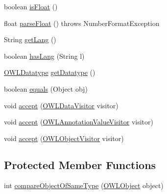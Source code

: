 \begin{DoxyCompactItemize}
\item 
boolean \hyperlink{classuk_1_1ac_1_1manchester_1_1cs_1_1owl_1_1owlapi_1_1_o_w_l_literal_impl_boolean_a41fe2545d488d2fba782b824fadce5df}{is\-Float} ()
\item 
float \hyperlink{classuk_1_1ac_1_1manchester_1_1cs_1_1owl_1_1owlapi_1_1_o_w_l_literal_impl_boolean_a98d226538c9fdf371e3acd25391d15f3}{parse\-Float} ()  throws Number\-Format\-Exception 
\item 
String \hyperlink{classuk_1_1ac_1_1manchester_1_1cs_1_1owl_1_1owlapi_1_1_o_w_l_literal_impl_boolean_afed3924cccc1c0922913be49980ade4b}{get\-Lang} ()
\item 
boolean \hyperlink{classuk_1_1ac_1_1manchester_1_1cs_1_1owl_1_1owlapi_1_1_o_w_l_literal_impl_boolean_ae4c2edb168c84b374b988f55fb19ab98}{has\-Lang} (String l)
\item 
\hyperlink{interfaceorg_1_1semanticweb_1_1owlapi_1_1model_1_1_o_w_l_datatype}{O\-W\-L\-Datatype} \hyperlink{classuk_1_1ac_1_1manchester_1_1cs_1_1owl_1_1owlapi_1_1_o_w_l_literal_impl_boolean_a3539c0a6c54b627b1e14080d4c434605}{get\-Datatype} ()
\item 
boolean \hyperlink{classuk_1_1ac_1_1manchester_1_1cs_1_1owl_1_1owlapi_1_1_o_w_l_literal_impl_boolean_a57839b38049d51274ae7412f03531224}{equals} (Object obj)
\item 
void \hyperlink{classuk_1_1ac_1_1manchester_1_1cs_1_1owl_1_1owlapi_1_1_o_w_l_literal_impl_boolean_a24e513d913080412d6f4e68d5badd43f}{accept} (\hyperlink{interfaceorg_1_1semanticweb_1_1owlapi_1_1model_1_1_o_w_l_data_visitor}{O\-W\-L\-Data\-Visitor} visitor)
\item 
void \hyperlink{classuk_1_1ac_1_1manchester_1_1cs_1_1owl_1_1owlapi_1_1_o_w_l_literal_impl_boolean_a65b9541763f59bb92917425d8c55010c}{accept} (\hyperlink{interfaceorg_1_1semanticweb_1_1owlapi_1_1model_1_1_o_w_l_annotation_value_visitor}{O\-W\-L\-Annotation\-Value\-Visitor} visitor)
\item 
void \hyperlink{classuk_1_1ac_1_1manchester_1_1cs_1_1owl_1_1owlapi_1_1_o_w_l_literal_impl_boolean_acee1de2651e310c758d7cfab07f4ecd3}{accept} (\hyperlink{interfaceorg_1_1semanticweb_1_1owlapi_1_1model_1_1_o_w_l_object_visitor}{O\-W\-L\-Object\-Visitor} visitor)
\end{DoxyCompactItemize}
\subsection*{Protected Member Functions}
\begin{DoxyCompactItemize}
\item 
int \hyperlink{classuk_1_1ac_1_1manchester_1_1cs_1_1owl_1_1owlapi_1_1_o_w_l_literal_impl_boolean_a077338f7e18c9e2f05d9877270a384ea}{compare\-Object\-Of\-Same\-Type} (\hyperlink{interfaceorg_1_1semanticweb_1_1owlapi_1_1model_1_1_o_w_l_object}{O\-W\-L\-Object} object)
\end{DoxyCompactItemize}
